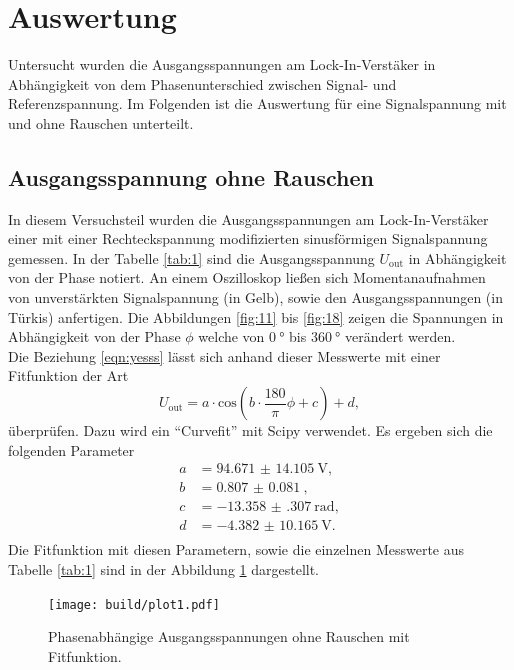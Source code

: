 \section{Auswertung}

Untersucht wurden die Ausgangsspannungen am Lock-In-Verstäker in Abhängigkeit von dem Phasenunterschied zwischen Signal- und Referenzspannung. Im Folgenden ist die Auswertung 
für eine Signalspannung mit und ohne Rauschen unterteilt.

\subsection{Ausgangsspannung ohne Rauschen}
In diesem Versuchsteil wurden die Ausgangsspannungen am Lock-In-Verstäker einer mit einer Rechteckspannung modifizierten sinusförmigen Signalspannung gemessen. In der Tabelle \ref{tab:1}
sind die Ausgangsspannung $U_{\text{out}}$ in Abhängigkeit von der Phase notiert. An einem Oszilloskop ließen sich Momentanaufnahmen von unverstärkten Signalspannung (in Gelb), sowie den Ausgangsspannungen (in Türkis) anfertigen.
Die Abbildungen \ref{fig:11} bis \ref{fig:18} zeigen die Spannungen in Abhängigkeit von der Phase $\phi$ welche von $\SI{0}{\degree}$ bis $\SI{360}{\degree}$ verändert werden.
\\
\newline 
Die Beziehung \eqref{eqn:yesss} lässt sich anhand dieser Messwerte mit einer Fitfunktion der Art 
\begin{equation}
    \label{eqn:fit}
U_{\text{out}} = a \cdot \text{cos}(b \cdot \frac{180}{\pi} \phi + c) + d,
\end{equation}
überprüfen. Dazu wird ein \enquote{Curvefit} mit Scipy \cite{scipy} verwendet.
Es ergeben sich die folgenden Parameter
\begin{align*}
    a &= \SI{94.671(14105)}{\volt},\\
    b &= \SI{0.807(81)}{},\\
    c &= \SI{-13.358(307)}{\radian},\\
    d &= \SI{-4.382(10165)}{\volt}.\\
\end{align*}
Die Fitfunktion mit diesen Parametern, sowie die einzelnen Messwerte aus Tabelle \ref{tab:1} sind in der Abbildung \ref{fig:licht} dargestellt.
\begin{figure}
    \centering
    \texttt{[image: build/plot1.pdf]}
    \caption{Phasenabhängige Ausgangsspannungen ohne Rauschen mit Fitfunktion.} 
    \label{fig:licht}
\end{figure}
